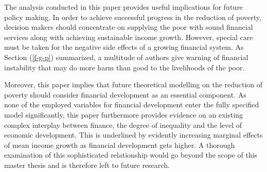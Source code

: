 \documentclass[12pt, a4paper]{article}
\begin{document}
The analysis conducted in this paper provides useful implications for future policy making. In order to achieve successful progress in the reduction of poverty, decision makers should concentrate on supplying the poor with sound financial services along with achieving sustainable income growth. However, special care must be taken for the negative side effects of a growing financial system. As Section (\ref{f-g-p}) summarized, a multitude of authors give warning of financial instability that may do more harm than good to the livelihoods of the poor.

Moreover, this paper implies that future theoretical modelling on the reduction of poverty should consider financial development as an essential component. As none of the employed variables for financial development enter the fully specified model significantly, this paper furthermore provides evidence on an existing complex interplay between finance, the degree of inequality and the level of economic development. This is underlined by evidently increasing marginal effects of mean income growth as financial development gets higher. A thorough examination of this sophisticated relationship would go beyond the scope of this master thesis and is therefore left to future research.
\end{document}
